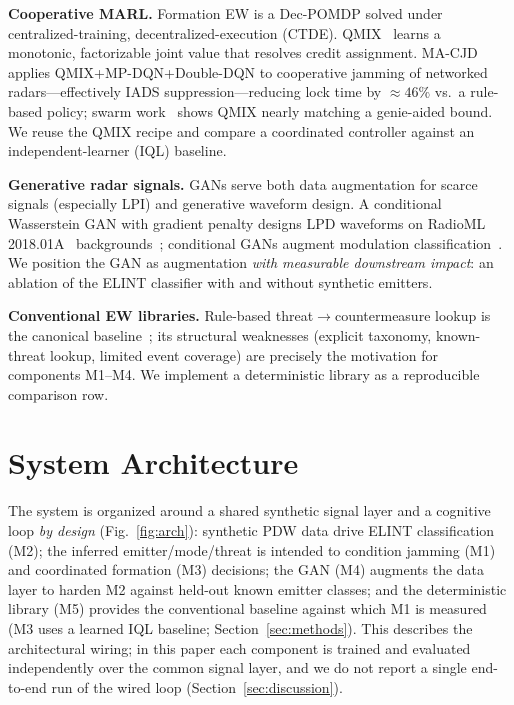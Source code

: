 \documentclass[journal]{IEEEtran}
\begin{document}
\textbf{Cooperative MARL.} Formation EW is a Dec-POMDP solved under centralized-training,
decentralized-execution (CTDE). QMIX~\cite{rashid2020qmix} learns a monotonic, factorizable
joint value that resolves credit assignment. MA-CJD~\cite{cai2025macjd} applies
QMIX+MP-DQN+Double-DQN to cooperative jamming of networked radars---effectively IADS
suppression---reducing lock time by $\approx 46\%$ vs.\ a rule-based policy; swarm
work~\cite{swarm2025qmix} shows QMIX nearly matching a genie-aided bound. We reuse the QMIX
recipe and compare a coordinated controller against an independent-learner (IQL) baseline.

\textbf{Generative radar signals.} GANs serve both data augmentation for scarce signals
(especially LPI) and generative waveform design. A conditional Wasserstein GAN with gradient
penalty designs LPD waveforms on RadioML 2018.01A~\cite{oshea2018radioml}
backgrounds~\cite{lpd2025cwgan}; conditional
GANs augment modulation classification~\cite{tang2020cgan,wdcgan2026}. We position the GAN as
augmentation \emph{with measurable downstream impact}: an ablation of the ELINT classifier with
and without synthetic emitters.

\textbf{Conventional EW libraries.} Rule-based threat$\to$countermeasure lookup is the canonical
baseline~\cite{cai2025macjd,emsopedia_cognitiveew}; its structural weaknesses (explicit
taxonomy, known-threat lookup, limited event coverage) are precisely the motivation for
components M1--M4. We implement a deterministic library as a reproducible comparison row.

\section{System Architecture}
\label{sec:arch}
The system is organized around a shared synthetic signal layer and a cognitive loop \emph{by
design} (Fig.~\ref{fig:arch}): synthetic PDW data drive ELINT classification (M2); the inferred
emitter/mode/threat is intended to condition jamming (M1) and coordinated formation (M3)
decisions; the GAN (M4) augments the data layer to harden M2 against held-out known emitter classes; and
the deterministic library (M5) provides the conventional baseline against which M1 is measured
(M3 uses a learned IQL baseline; Section~\ref{sec:methods}). This describes the architectural wiring; in this paper each component is trained and
evaluated independently over the common signal layer, and we do not report a single end-to-end
run of the wired loop (Section~\ref{sec:discussion}).
\end{document}
